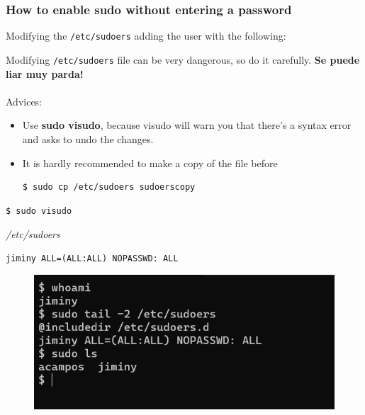 \documentclass{article}
\newenvironment{blocktemplateIII}[1]{%
    \tcolorbox[beamer,%
    noparskip,breakable,
    ,colframe=Red,%
    colbacklower=LimeGreen!75!LightGreen,%
    title=#1]}%
    {\endtcolorbox}
\newenvironment{codetemplate}[1][]{%
  \mybasecolorbox[#1]
  \itshape
}{%
  \endmybasecolorbox
}
\begin{document}
\subsubsection{How to enable sudo without entering a password}
Modifying the \verb|/etc/sudoers| adding the user with the following:

\begin{blocktemplateIII}{WARNING}
Modifying \verb|/etc/sudoers| file can be very dangerous, so do it carefully. \textbf{Se puede liar muy parda!}
\\\\
Advices:
\begin{itemize}
    \item Use \textbf{sudo visudo}, because visudo will warn you that there’s a syntax error and asks to undo the changes.
    \item It is hardly recommended to make a copy of the file before
\begin{codetemplate}{}
\begin{verbatim}
$ sudo cp /etc/sudoers sudoerscopy
\end{verbatim}
\end{codetemplate}
\end{itemize}
\end{blocktemplateIII}

\begin{codetemplate}{}
\begin{verbatim}
$ sudo visudo
\end{verbatim}
\end{codetemplate}
\begin{codetemplate}{/etc/sudoers}
\begin{verbatim}
jiminy ALL=(ALL:ALL) NOPASSWD: ALL
\end{verbatim}
\end{codetemplate}

\begin{figure}[H]
    \includegraphics[scale=0.8]{pictures/jiminyboss.png}
    \centering
\end{figure}
\end{document}
